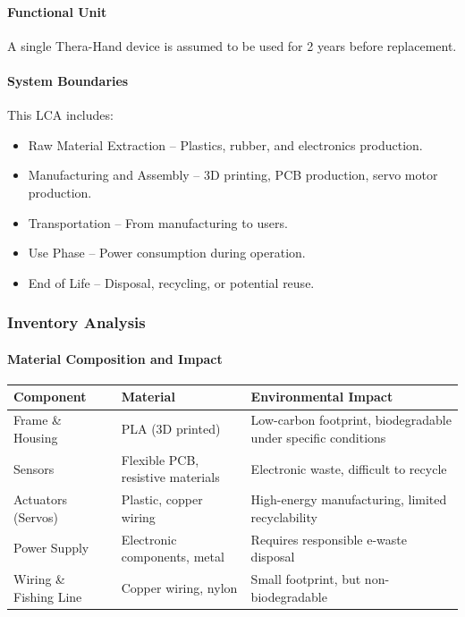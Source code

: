 \documentclass{article}
\begin{document}
\paragraph{Functional Unit}
A single Thera-Hand device is assumed to be used for 2 years before replacement.
\paragraph{System Boundaries}
This LCA includes:
\begin{itemize}
\item Raw Material Extraction – Plastics, rubber, and electronics production.
\item Manufacturing and Assembly – 3D printing, PCB production, servo motor production.
\item Transportation – From manufacturing to users.
\item Use Phase – Power consumption during operation.
\item End of Life – Disposal, recycling, or potential reuse.
\end{itemize}
\subsubsection{Inventory Analysis}
\paragraph{Material Composition and Impact}
\begin{table}[h]
    \hspace*{-3.5cm}
    \centering
    \begin{tabular}{|l|l|l|}
        \hline
        \textbf{Component} & \textbf{Material} & \textbf{Environmental Impact} \\ 
        \hline
        Frame \& Housing & PLA (3D printed) & Low-carbon footprint, biodegradable under specific conditions \\ 
        \hline
        Sensors & Flexible PCB, resistive materials & Electronic waste, difficult to recycle \\ 
        \hline
        Actuators (Servos) & Plastic, copper wiring & High-energy manufacturing, limited recyclability \\ 
        \hline
        Power Supply & Electronic components, metal & Requires responsible e-waste disposal \\ 
        \hline
        Wiring \& Fishing Line & Copper wiring, nylon & Small footprint, but non-biodegradable \\ 
        \hline
    \end{tabular}
    \label{tab:material_composition}
\end{table}
\end{document}
